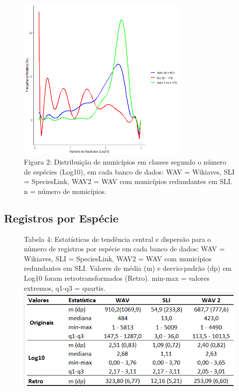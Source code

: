 \texto

\begin{figure}[h!]
\centering
\includegraphics[height = 8cm]{Imagens/123.png}
\\{\scriptsize Figura 2: Distribuição de municípios em classes segundo o número de espécies (Log10), em cada banco de dados: WAV = Wikiaves, SLI = SpeciesLink, WAV2 = WAV com municípios redundantes em SLI. n = número de municípios. }
\end{figure}

\subsection{Registros por Espécie}

\begin{figure}[h!]
\centering
{\scriptsize Tabela 4: Estatísticas de tendência central e dispersão para o número de registros por espécie em cada banco de dados: WAV = Wikiaves, SLI = SpeciesLink, WAV2 = WAV com municípios redundantes em SLI. Valores de média (m) e desvio-padrão (dp) em Log10 foram retrotransformados (Retro). min-max = valores extremos, q1-q3 = quartis.}
\includegraphics{Tabelas/4.png}
\end{figure}

